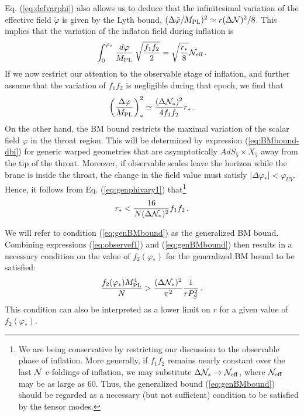 Eq. (\ref{eq:defvarphi}) also allows us to deduce 
that the infinitesimal variation of the effective 
field $\tilde{\varphi}$ is given by the Lyth bound, 
$(\Delta \tilde{\varphi} /M_{\mathrm{PL}} )^2 \simeq 
r (\Delta {\cal{N}})^2/8$. This implies that 
the variation of the inflaton field during inflation is 
% 
\begin{equation}
\label{eq:newphivar}
\int_0^{\varphi_{*}} \frac{d\varphi}{M_{\mathrm{PL}}} \, \sqrt{\frac{f_1f_2}{2}} 
= \sqrt{\frac{r_*}{8}}  {\cal{N}}_{\mathrm{eff}} \,.
\end{equation}
% 
If we now restrict our attention to 
the observable stage of inflation, and further assume that the variation
of $f_1f_2$ is negligible during that epoch, we find that 
% 
\begin{equation}
\label{eq:genphivary1}
\left( \frac{\Delta \varphi}{M_{\mathrm{PL}}} \right)^2_{*} \simeq 
\frac{(\Delta {\cal{N}}_{*} )^2}{4 f_1f_2} r_*  \,.
\end{equation}
% 
On the other hand, the BM bound restricts the maximal 
variation of the scalar field $\varphi$ in the throat region. 
This will be determined by expression (\ref{eq:BMbound-dbi}) 
for generic warped geometries that are asymptotically 
$AdS_5 \times X_5$ away from the tip of the throat. Moreover, 
if observable scales leave the horizon 
while the brane is inside the throat, the change in the field value 
must satisfy $| \Delta \varphi_*|<\varphi_{UV}$. Hence, it follows from   
Eq. (\ref{eq:genphivary1}) that\footnote{We are 
being conservative by restricting our discussion to the 
observable phase of inflation. More generally, if 
$f_1f_2$ remains nearly constant over the last ${\cal{N}}$ 
e-foldings of inflation, 
we may substitute $\Delta {\cal{N}}_* \rightarrow 
{\cal{N}}_{\mathrm{eff}}$, where ${\cal{N}}_{\mathrm{eff}}$ 
may be as large as 60. Thus, the generalized bound 
(\ref{eq:genBMbound}) should be regarded as a necessary 
(but not sufficient) condition to be satisfied by the tensor modes.} 
% 
\begin{equation}
\label{eq:genBMbound}
r_*< \frac{16}{N (\Delta {\cal{N}}_{*})^2} f_1f_2  \,.
\end{equation}
% 


We will refer to condition 
(\ref{eq:genBMbound}) as the 
generalized BM bound. 
Combining expressions (\ref{eq:observef1}) and (\ref{eq:genBMbound}) then
results in a necessary condition on the value of $f_2(\varphi_*)$ 
for the generalized BM bound to be satisfied:
%  
\begin{equation}
\label{eq:f2bound}
\frac{f_2 (\varphi_*)M_{\mathrm{PL}}^4}{N} > \frac{(\Delta {\cal{N}}_*)^2}{\pi^2} 
\frac{1}{rP_S^2} \,.
\end{equation}
% 
This condition can also be interpreted as a lower limit on $r$ 
for a given value of $f_2 (\varphi_*)$.  


